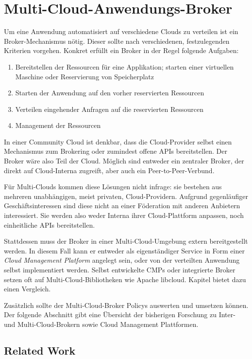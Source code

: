 \chapter{Multi-Cloud-Anwendungs-Broker}

Um eine Anwendung automatisiert auf verschiedene Clouds zu verteilen ist ein Broker-Mechanismus nötig. Dieser sollte nach verschiedenen, festzulegenden Kriterien vorgehen. Konkret erfüllt ein Broker in der Regel folgende Aufgaben:

\begin{enumerate}
	\item Bereitstellen der Ressourcen für eine Applikation; starten einer virtuellen Maschine oder Reservierung von Speicherplatz
	\item Starten der Anwendung auf den vorher reservierten Ressourcen
	\item Verteilen eingehender Anfragen auf die reservierten Ressourcen
	\item Management der Ressourcen
\end{enumerate}

\noindent In einer Community Cloud ist denkbar, dass die Cloud-Provider selbst einen Mechanismus zum Brokering oder zumindest offene APIs bereitstellen. Der Broker wäre also Teil der Cloud. Möglich sind entweder ein zentraler Broker, der direkt auf Cloud-Interna zugreift, aber auch ein Peer-to-Peer-Verbund.

Für Multi-Clouds kommen diese Lösungen nicht infrage: sie bestehen aus mehreren unabhängigen, meist privaten, Cloud-Providern. Aufgrund gegenläufiger Geschäftsinteressen sind diese nicht an einer Föderation mit anderen Anbietern interessiert. Sie werden also weder Interna ihrer Cloud-Plattform anpassen, noch einheitliche APIs bereitstellen.

Stattdessen muss der Broker in einer Multi-Cloud-Umgebung extern bereitgestellt werden. In diesem Fall kann er entweder als eigenständiger Service in Form einer \emph{Cloud Management Platform} angelegt sein, oder von der verteilten Anwendung selbst implementiert werden. Selbst entwickelte CMPs oder integrierte Broker setzen oft auf Multi-Cloud-Bibliotheken wie Apache libcloud. Kapitel  bietet dazu einen Vergleich. 

Zusätzlich sollte der Multi-Cloud-Broker Policys auswerten und umsetzen können. Der folgende Abschnitt gibt eine Übersicht der bisherigen Forschung zu Inter- und Multi-Cloud-Brokern sowie Cloud Management Plattformen.

\section{Related Work}


